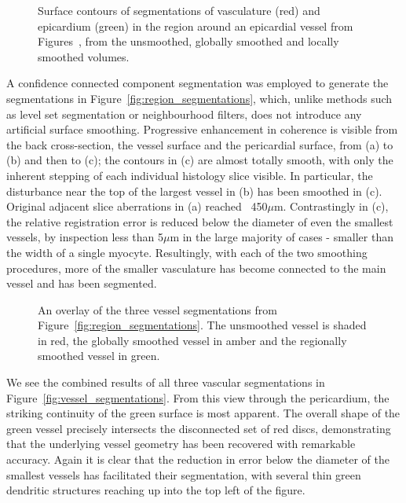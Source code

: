       \begin{figure}[p]
        \caption{Surface contours of segmentations of vasculature (red) and epicardium (green) in the region around an epicardial vessel from Figures~, from the unsmoothed, globally smoothed and locally smoothed volumes.}
      \end{figure}
    
       A confidence connected component segmentation was employed to generate the segmentations in Figure~\ref{fig:region_segmentations}, which, unlike methods such as level set segmentation or neighbourhood filters, does not introduce any artificial surface smoothing. Progressive enhancement in coherence is visible from the back cross-section, the vessel surface and the pericardial surface, from (a) to (b) and then to (c); the contours in (c) are almost totally smooth, with only the inherent stepping of each individual histology slice visible. In particular, the disturbance near the top of the largest vessel in (b) has been smoothed in (c). Original adjacent slice aberrations in (a) reached ~450$\mu$m. Contrastingly in (c), the relative registration error is reduced below the diameter of even the smallest vessels, by inspection less than 5$\mu$m in the large majority of cases - smaller than the width of a single myocyte. Resultingly, with each of the two smoothing procedures, more of the smaller vasculature has become connected to the main vessel and has been segmented.
    
      \begin{figure}[p]
        \caption{An overlay of the three vessel segmentations from Figure~\ref{fig:region_segmentations}. The unsmoothed vessel is shaded in red, the globally smoothed vessel in amber and the regionally smoothed vessel in green. }
      \end{figure}
    
      We see the combined results of all three vascular segmentations in Figure~\ref{fig:vessel_segmentations}. From this view through the pericardium, the striking continuity of the green surface is most apparent. The overall shape of the green vessel precisely intersects the disconnected set of red discs, demonstrating that the underlying vessel geometry has been recovered with remarkable accuracy. Again it is clear that the reduction in error below the diameter of the smallest vessels has facilitated their segmentation, with several thin green dendritic structures reaching up into the top left of the figure.
    

